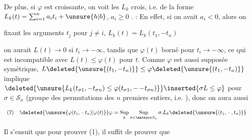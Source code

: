 De plus, si $\varphi$ est croissante, on voit  les $L_k$ crois, i.e.  de la forme $L_k(t)=\sum_{i=1}^n a_it_i+\unsure{h|b}$,  $a_i\geq0$ .  : En effet, si on avait $a_i<0$, alors  on

\reversemarginpar
{}
\normalmarginpar


fixant les arguments $t_j$ pour $j\ne i$, $L_k(t)=L_k(t_1,-t_n)$ \newline
{}\newline
{}

on aurait $L(t)\to0$ si $t_i\to-\infty$, tandis que $\varphi(t)$  borné pour $t_i\to-\infty$, ce  qui est incompatible avec $L(t)\leq\varphi(t)$ pour  $t$.  Comme  $\varphi$ est aussi supposée symétrique, $L\deleted{\unsure{(t_1,-t_n)}}\leq\varphi\deleted{\unsure{(t_1,-t_n)}}$  implique $\deleted{\unsure{L_k(t_{\sigma1},-t_{\sigma n})\leq\varphi(t_{\sigma1},\mathord{-}\,\mathord{-}t_{\sigma n})}}\inserted{\sigma L\leq\varphi}$ pour  $\sigma\in\mathscr S_n$ (groupe des permutations des $n$ premiers entiers, i.e. ), donc on aura aussi

\[
\begin{array}{ll}
(7)&\displaystyle\deleted{\unsure{\varphi(t_1,-t_n)|\varphi(t)}}\varphi=\operatorname*{Sup}_k\operatorname*{Sup}_{\sigma\in\mathscr S_n}\sigma.L_k\deleted{\unsure{(t_1,-,t_n)}}
\end{array}
\]

Il s'ensuit que  pour prouver (1), il suffit de prouver que  

